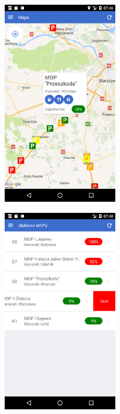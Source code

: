 \begin{figure}[!htb]
\centering
\begin{minipage}{.5\textwidth}
  \centering
  \includegraphics[width=5cm]{images/mopsik_mobile/map.png}
  \label{mopsik_map}
\end{minipage}%
\begin{minipage}{.5\textwidth}
  \centering
  \includegraphics[width=5cm]{images/mopsik_mobile/favourites.png}
  \label{mopsik_favourites}
\end{minipage}
\end{figure}

